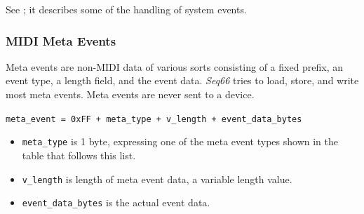    See ; it describes some of the
   handling of system events.

\subsubsection{MIDI Meta Events}
\label{subsubsec:midi_meta_events}

   Meta events are non-MIDI data of various sorts consisting of a fixed prefix,
   an event type, a length field, and the event data.
   \textsl{Seq66} tries to load, store, and write most meta events.
   Meta events are never sent to a device.
 
   \texttt{meta\_event = 0xFF + meta\_type + v\_length + event\_data\_bytes}

   \begin{itemize}
      \item \texttt{meta\_type} is 1 byte, expressing one of the meta event
         types shown in the table that follows this list.
      \item \texttt{v\_length} is length of meta event data, a variable
         length value.
      \item \texttt{event\_data\_bytes} is the actual event data.
   \end{itemize}

